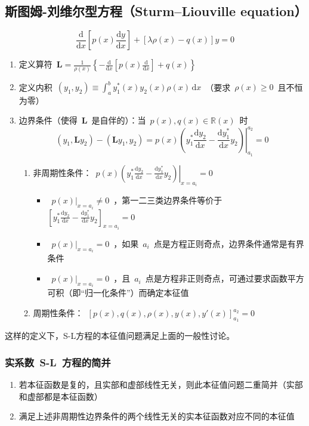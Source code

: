 \documentclass[12pt,a4paper]{article}
\newcommand\dif{\mathrm{d}}
\newcommand\diff{\,\mathrm{d}}
\renewcommand{\[}{\ $\displaystyle}
\renewcommand{\]}{$\ }%
\newcommand{\fdif}[2]{\ensuremath{\frac{\dif #1}{\dif #2}}}
\begin{document}
	\subsection{斯图姆-刘维尔型方程（Sturm–Liouville equation）}
		$$
		  \fdif{}{x}\left[p(x)\fdif{y}{x}\right] + [\lambda \rho(x) - q(x)]y = 0
		$$
		\begin{enumerate}
		 \item 定义算符\[\bm{L} = \frac{1}{\rho(x)}\left\{-\fdif{}{x}\left[p(x)\fdif{}{x}\right] + q(x)\right\}\]
		 \item 定义内积\[(y_1,y_2) \equiv \int_a^b y_1^*(x)y_2(x)\rho(x)\diff x\]（要求\[\rho(x)\ge 0\]且不恒为零）
		 \item 边界条件（使得\[\bm L\]是自伴的）：当\[p(x),q(x)\in \mathbb{R} (x)\]时
		 $$
		 (y_1,\bm{L}y_2) - (\bm{L}y_1,y_2) = \left. p(x)\left(y_1^*\fdif{y_2}{x} - \fdif{y_1^*}{x}y_2\right)\right|_{a_1}^{a_2} = 0
		 $$
		 	\begin{enumerate}
		 	 \item 非周期性条件：\[\left.p(x)\left(y_1^*\fdif{y_2}{x} - \fdif{y_1^*}{x}y_2\right)\right|_{x= a_i}= 0\]
		 	 \begin{itemize}
		 		\item \[p(x)|_{x = a_i}\neq 0\]，第一二三类边界条件等价于\[\left[y_1^*\fdif{y_2}{x} - \fdif{y_1^*}{x}y_2\right]_{x=a_i} = 0\]
		 		\item \[p(x)|_{x = a_i} = 0\]，如果\[a_i\]点是方程正则奇点，边界条件通常是有界条件
		 		\item \[p(x)|_{x = a_i} = 0\]，且\[a_i\]点是方程非正则奇点，可通过要求函数平方可积（即“归一化条件”）而确定本征值
		 	 \end{itemize}
		 	 \item 周期性条件：\[[p(x),q(x),\rho(x),y(x),y'(x)]_{a_1}^{a_2} = 0\]
		 	\end{enumerate}
		\end{enumerate}
		
		这样的定义下，S-L方程的本征值问题满足上面的一般性讨论。
		\subsubsection{实系数~S-L~方程的简并}
		\begin{enumerate}
		 \item 若本征函数是复的，且实部和虚部线性无关，则此本征值问题二重简并（实部和虚部都是本征函数）
		 \item 满足上述非周期性边界条件的两个线性无关的实本征函数对应不同的本征值
		\end{enumerate}
		
\end{document}
